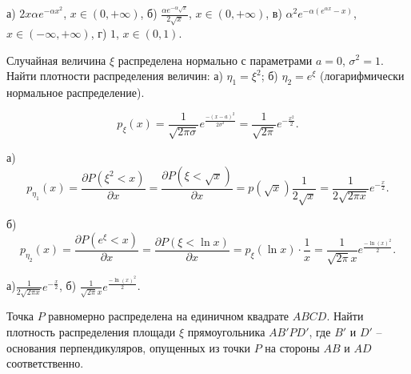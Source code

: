 \begin{result}
а) $2x \alpha e^{-\alpha x^2}$, $x \in (0, +\infty)$, б) $\frac{\alpha e^{-\alpha\sqrt{x}
}}{2\sqrt{x} }$, $x \in (0, +\infty)$, в) $\alpha^2 e^{-\alpha(e^{\alpha x} - x)}$, $x \in (-\infty,
+\infty)$, г) $1$, $x \in (0, 1)$.
\end{result}

\medskip
\begin{task}{4}
  Случайная величина $\xi$ распределена нормально с параметрами $a = 0$, $\sigma^2 = 1$. Найти 
  плотности распределения величин: а) $\eta_1 = \xi^2$; б) $\eta_2 = e^\xi$ (логарифмически нормальное
  распределение).
\end{task}

\[
  p_{\xi}(x) = \frac{1}{\sqrt{2\pi\sigma}} e^{\frac{-(x - a)^2}{2\sigma^2}} = \frac{1}{\sqrt{2\pi}}
  e^{-\frac{x^2}{2}}
.\] 

\begin{subtask}{а)}
\[
p_{\eta_1}(x) = \frac{\partial P(\xi^2 < x)}{\partial x} = \frac{\partial P(\xi < \sqrt{x})
}{\partial x} = p(\sqrt{x}) \frac{1}{2\sqrt{x} } = \frac{1}{2\sqrt{2\pi x} }e^{-\frac{x}{2}}
.\] 
\end{subtask}

\begin{subtask}{б)}
\[
p_{\eta_2}(x) = \frac{\partial P(e^\xi < x)}{\partial x} = \frac{\partial P(\xi < \ln x)}{\partial x}
= p_\xi(\ln x) \cdot \frac{1}{x} = \frac{1}{\sqrt{2\pi} x} e^{\frac{-\ln(x)^2}{2}}
.\] 
\end{subtask}

\begin{result}
а)$ \frac{1}{2\sqrt{2\pi x} }e^{-\frac{x}{2}} $, б) $\frac{1}{\sqrt{2\pi} x}
e^{\frac{-\ln(x)^2}{2}}$.
\end{result}

\medskip
\begin{task}{5}
  Точка $P$ равномерно распределена на единичном квадрате $ABCD$. Найти плотность распределения 
  площади  $\xi$ прямоугольника $AB'PD'$, где $B'$ и $D'$ -- основания перпендикуляров, опущенных
  из точки $P$ на стороны $AB$ и $AD$ соответственно.
\end{task}

